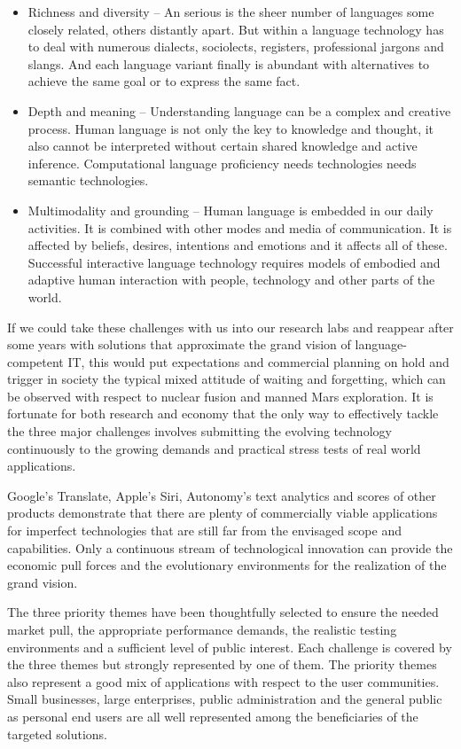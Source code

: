 \documentclass[10pt, plain]{../../metanetpaper}
\begin{document}
\begin{multicols}{2}
\begin{itemize}
\item Richness and diversity – An serious is the sheer number of languages some closely related, others distantly apart. But within a language technology has to deal with numerous dialects, sociolects, registers, professional jargons and slangs. And each language variant finally is abundant with alternatives to achieve the same goal or to express the same fact.
\item Depth and meaning  –  Understanding language can be a complex and creative process.  Human language is not only the key to knowledge and thought, it also cannot be interpreted without certain shared knowledge and active inference. Computational language proficiency needs technologies needs semantic technologies.
\item Multimodality and grounding – Human language is embedded in our daily activities. It is combined with other modes and media of communication. It is affected by beliefs, desires, intentions and emotions and it affects all of these. Successful interactive language technology requires models of embodied and adaptive human interaction with people, technology and other parts of the world.
\end{itemize}
 
If we could take these challenges with us into our research labs and reappear after some years with solutions that approximate the grand vision of language-competent IT, this would put expectations and commercial planning on hold and trigger in society the typical mixed attitude of waiting and forgetting, which can be observed with respect to nuclear fusion and manned Mars exploration. It is fortunate for both research and economy that the only way to effectively tackle the three major challenges involves submitting the evolving technology continuously to the growing demands and practical stress tests of real world applications.

Google’s Translate, Apple’s Siri, Autonomy’s text analytics and scores of other products demonstrate that there are plenty of commercially viable applications for imperfect technologies that are still far from the envisaged scope and capabilities. Only a continuous stream of technological innovation can provide the economic pull forces and the evolutionary environments for the realization of the grand vision. 

The three priority themes have been thoughtfully selected to ensure the needed market pull, the appropriate performance demands, the realistic testing environments and a sufficient level of public interest. Each challenge is covered by the three themes but strongly represented by one of them.  The priority themes also represent a good mix of applications with respect to the user communities. Small businesses, large enterprises, public administration and the general public as personal end users are all well represented among the beneficiaries of the targeted solutions.
\end{multicols}
\end{document}

